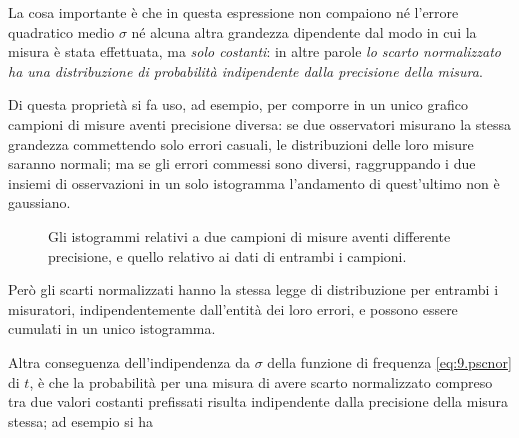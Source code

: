La cosa importante \`e che in questa espressione non
compaiono n\'e l'errore quadratico medio $\sigma$ n\'e
alcuna altra grandezza dipendente dal modo in cui la misura
\`e stata effettuata, ma \emph{solo costanti}: in altre
parole \emph{lo scarto normalizzato ha una distribuzione di
  probabilit\`a indipendente dalla precisione della misura}.

Di questa propriet\`a si fa uso, ad esempio, per comporre in
un unico grafico campioni di misure aventi precisione
diversa: se due osservatori misurano la stessa grandezza
commettendo solo errori casuali, le distribuzioni delle loro
misure saranno normali; ma se gli errori commessi sono
diversi, raggruppando i due insiemi di osservazioni in un
solo istogramma l'andamento di quest'ultimo non \`e
gaussiano.
\begin{figure}[htbp]
  \vspace*{2ex}
  \begin{center} {
    
  } \end{center}
  \caption[Istogrammi di dati con differente precisione]
    {Gli istogrammi relativi a due campioni di
    misure aventi differente precisione, e quello
    relativo ai dati di entrambi i campioni.}
\end{figure}
Per\`o gli scarti normalizzati hanno la stessa legge di
distribuzione per entrambi i misuratori, indipendentemente
dall'entit\`a dei loro errori, e possono essere cumulati in
un unico istogramma.

Altra conseguenza dell'indipendenza da $\sigma$ della
funzione di frequenza \eqref{eq:9.pscnor} di $t$, \`e che la
probabilit\`a per una misura di avere scarto normalizzato
compreso tra due valori costanti prefissati risulta
indipendente dalla precisione della misura stessa; ad
esempio si ha

